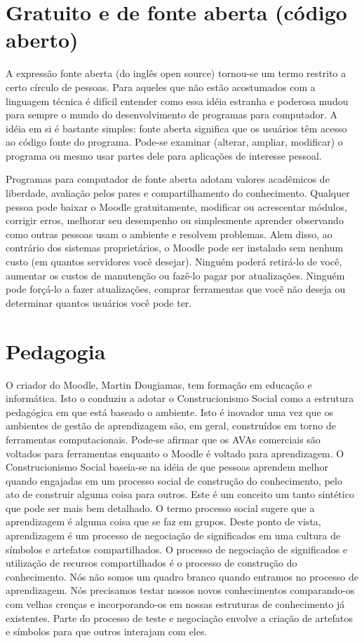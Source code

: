 \section{Gratuito e de fonte aberta (código aberto)}

A expressão fonte aberta (do inglês open source) tornou-se um termo restrito a certo círculo de pessoas. Para aqueles que não estão acostumados com a linguagem técnica é difícil entender como essa idéia estranha e poderosa mudou para sempre o mundo do desenvolvimento de programas para computador. A idéia em si é bastante simples: fonte aberta significa que os usuários têm acesso ao código fonte do programa. Pode-se examinar (alterar, ampliar, modificar) o programa ou mesmo usar partes dele para aplicações de interesse pessoal.

Programas para computador de fonte aberta adotam valores acadêmicos de liberdade, avaliação pelos pares e compartilhamento do conhecimento. Qualquer pessoa pode baixar o Moodle gratuitamente, modificar ou acrescentar módulos, corrigir erros, melhorar seu desempenho ou simplesmente aprender observando como outras pessoas usam o ambiente e resolvem problemas. Alem disso, ao contrário dos sistemas proprietários, o Moodle pode ser instalado sem nenhum custo (em quantos servidores você desejar). Ninguém poderá retirá-lo de você, aumentar os custos de manutenção ou fazê-lo pagar por atualizações. Ninguém pode forçá-lo a fazer atualizações, comprar ferramentas que você não deseja ou determinar quantos usuários você pode ter.


\section{Pedagogia}

O criador do Moodle, Martin Dougiamas, tem formação em educação e informática. Isto o conduziu a adotar o Construcionismo Social como a estrutura pedagógica em que está baseado o ambiente. Isto é inovador uma vez que os ambientes de gestão de aprendizagem são, em geral, construídos em torno de ferramentas computacionais. Pode-se afirmar que os AVAs comerciais são voltados para ferramentas enquanto o Moodle é voltado para aprendizagem. O Construcionismo Social baseia-se na idéia de que pessoas aprendem melhor quando engajadas em um processo social de construção do conhecimento, pelo ato de construir alguma coisa para outros. Este é um conceito um tanto sintético que pode ser mais bem detalhado. O termo processo social sugere que a aprendizagem é alguma coisa que se faz em grupos. Deste ponto de vista, aprendizagem é um processo de negociação de significados em uma cultura de símbolos e artefatos compartilhados. O processo de negociação de significados e utilização de recursos compartilhados é o processo de 
construção do conhecimento. Nós não somos um quadro branco quando entramos no processo de aprendizagem. Nós precisamos testar nossos novos conhecimentos comparando-os com velhas crenças e incorporando-os em nossas estruturas de conhecimento já existentes. Parte do processo de teste e negociação envolve a criação de artefatos e símbolos para que outros interajam com eles.

